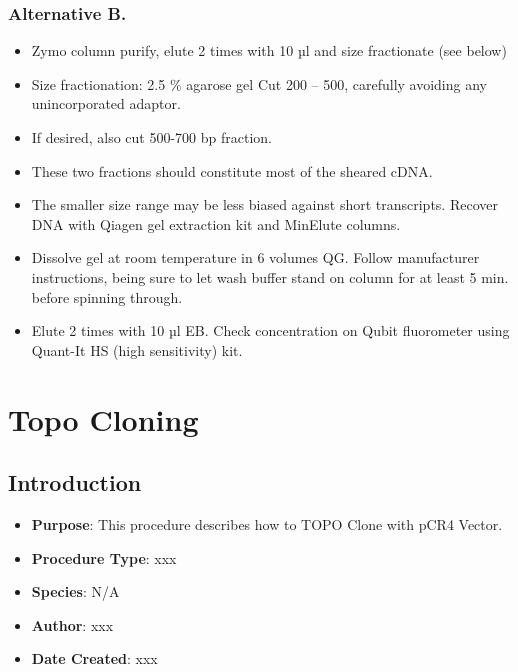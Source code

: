 \documentclass[
  letterpaper,
  DIV=11,
  numbers=noendperiod]{scrreprt}
\providecommand{\tightlist}{%
  \setlength{\itemsep}{0pt}\setlength{\parskip}{0pt}}\usepackage{longtable,booktabs,array}
\begin{document}
\hypertarget{alternative-b.}{%
\subsection{Alternative B.}\label{alternative-b.}}

\begin{itemize}
\tightlist
\item
  Zymo column purify, elute 2 times with 10 µl and size fractionate (see
  below)
\item
  Size fractionation: 2.5 \% agarose gel Cut 200 -- 500, carefully
  avoiding any unincorporated adaptor.
\item
  If desired, also cut 500-700 bp fraction.
\item
  These two fractions should constitute most of the sheared cDNA.
\item
  The smaller size range may be less biased against short transcripts.
  Recover DNA with Qiagen gel extraction kit and MinElute columns.
\item
  Dissolve gel at room temperature in 6 volumes QG. Follow manufacturer
  instructions, being sure to let wash buffer stand on column for at
  least 5 min. before spinning through.
\item
  Elute 2 times with 10 µl EB. Check concentration on Qubit fluorometer
  using Quant-It HS (high sensitivity) kit.
\end{itemize}

\hypertarget{sec-molecular-TopoClone}{%
\chapter{Topo Cloning}\label{sec-molecular-TopoClone}}

\hypertarget{introduction-25}{%
\section{Introduction}\label{introduction-25}}

\begin{itemize}
\tightlist
\item
  \textbf{Purpose}: This procedure describes how to TOPO Clone with pCR4
  Vector.
\item
  \textbf{Procedure Type}: xxx
\item
  \textbf{Species}: N/A
\item
  \textbf{Author}: xxx
\item
  \textbf{Date Created}: xxx
\end{itemize}
\end{document}

